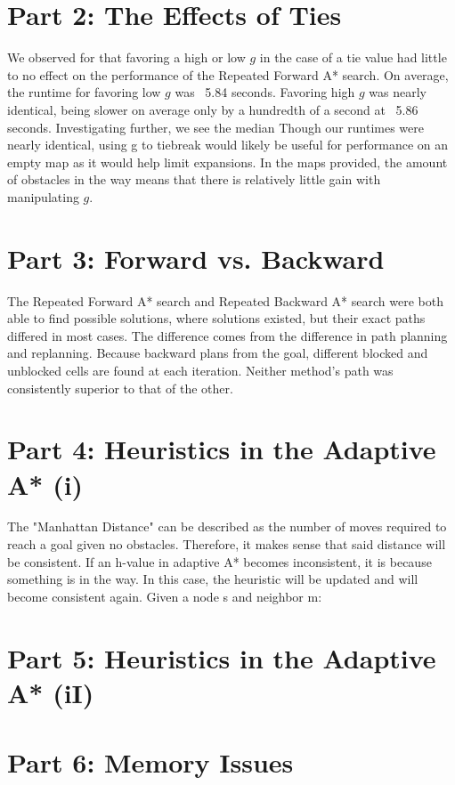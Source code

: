 \documentclass[a4paper,12pt]{article}
\begin{document}
\section{Part 2: The Effects of Ties}
We observed for that favoring a high or low $g$ in the case of a tie value had little to no effect on the performance of the Repeated Forward A* search. On average, the runtime for favoring low $g$ was ~5.84 seconds. Favoring high $g$ was nearly identical, being slower on average only by a hundredth of a second at ~5.86 seconds. Investigating further, we see the median Though our runtimes were nearly identical, using g to tiebreak would likely be useful for performance on an empty map as it would help limit expansions. In the maps provided, the amount of obstacles in the way means that there is relatively little gain with manipulating $g$.
 	
\section{Part 3: Forward vs. Backward}
The Repeated Forward A* search and Repeated Backward A* search were both able to find possible solutions, where solutions existed, but their exact paths differed in most cases. The difference comes from the difference in path planning and replanning. Because backward plans from the goal, different blocked and unblocked cells are found at each iteration. Neither method’s path was consistently superior to that of the other. 

\section{Part 4: Heuristics in the Adaptive A* (i)}
The "Manhattan Distance" can be described as the number of moves required to reach a goal given no obstacles. Therefore, it makes sense that said distance will be consistent. If an h-value in adaptive A* becomes inconsistent, it is because something is in the way. In this case, the heuristic will be updated and will become consistent again. \newline
Given a node s and neighbor m: \newline

\section{Part 5:  Heuristics in the Adaptive A* (iI)}

\section{Part 6: Memory Issues}
\end{document}
